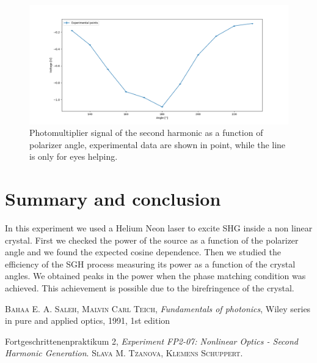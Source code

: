 \documentclass[a4paper,10pt]{article}
\begin{document}
\begin{figure}[H]
\centering
\includegraphics[width = \textwidth]{polarization2}
\caption{Photomultiplier signal of the second harmonic as a function of polarizer angle, experimental data are shown in point, while the line is only for eyes helping.}
\label{polarization2}
\end{figure}
\section{Summary and conclusion}
In this experiment we used a Helium Neon laser to excite SHG inside a non linear crystal. First we checked the power of the source as a function of the polarizer angle and we found the expected cosine dependence. Then we studied the efficiency of the SGH process measuring its power as a function of the crystal angles. We obtained peaks in the power when the phase matching condition was achieved. This achievement is possible due to the birefringence of the crystal.

\begin{thebibliography}{99}
  \textsc{Bahaa E. A. Saleh, Malvin Carl Teich}, \textit{Fundamentals of photonics}, Wiley series in pure and applied optics, 1991, 1st edition

Fortgeschrittenenpraktikum 2, \textit{Experiment FP2-07: Nonlinear Optics - Second Harmonic Generation}. \textsc{Slava M. Tzanova, Klemens Schuppert}.
\end{thebibliography}
\end{document}

